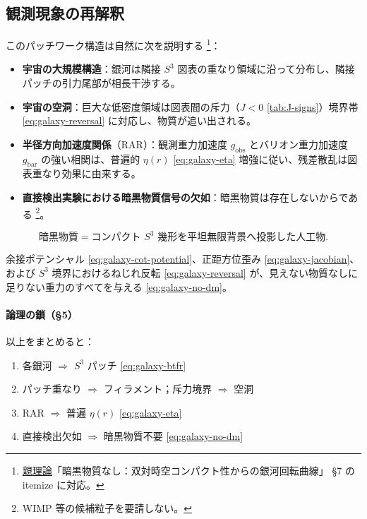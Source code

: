 \documentclass[dvipdfmx,a4paper,oneside]{jsbook}
\numberwithin{equation}{chapter}
\begin{document}
\subsection{観測現象の再解釈}

このパッチワーク構造は自然に次を説明する \footnote{\hyperref[sec:sister-manuscripts]{親理論}「暗黒物質なし：双対時空コンパクト性からの銀河回転曲線」 §7 の itemize に対応。}：
\begin{itemize}[leftmargin=2em]
  \item \textbf{宇宙の大規模構造}：銀河は隣接 \(S^3\) 図表の重なり領域に沿って分布し、隣接パッチの引力尾部が相長干渉する。
  \item \textbf{宇宙の空洞}：巨大な低密度領域は図表間の斥力（\(J < 0\) \eqref{tab:J-signs}）境界帯 \eqref{eq:galaxy-reversal} に対応し、物質が追い出される。
  \item \textbf{半径方向加速度関係}（RAR）：観測重力加速度 \(g_{\mathrm{obs}}\) とバリオン重力加速度 \(g_{\mathrm{bar}}\) の強い相関は、普遍的 \(\eta(r)\) \eqref{eq:galaxy-eta} 増強に従い、残差散乱は図表重なり効果に由来する。
  \item \textbf{直接検出実験における暗黒物質信号の欠如}：暗黒物質は存在しないからである \footnote{WIMP 等の候補粒子を要請しない。}。
\end{itemize}

\begin{equation}
  \boxed{\;
  \text{暗黒物質} = \text{コンパクト } S^3 \text{ 幾形を平坦無限背景へ投影した人工物}.
  \;}
  \label{eq:galaxy-no-dm}
\end{equation}

余接ポテンシャル \eqref{eq:galaxy-cot-potential}、正距方位歪み \eqref{eq:galaxy-jacobian}、および \(S^3\) 境界におけるねじれ反転 \eqref{eq:galaxy-reversal} が、見えない物質なしに足りない重力のすべてを与える \eqref{eq:galaxy-no-dm}。

\paragraph{論理の鎖（§5）}
以上をまとめると：
\begin{enumerate}[leftmargin=2em]
  \item 各銀河 \(\Rightarrow\) \(S^3\) パッチ \eqref{eq:galaxy-btfr}
  \item パッチ重なり \(\Rightarrow\) フィラメント；斥力境界 \(\Rightarrow\) 空洞
  \item RAR \(\Rightarrow\) 普遍 \(\eta(r)\) \eqref{eq:galaxy-eta}
  \item 直接検出欠如 \(\Rightarrow\) 暗黒物質不要 \eqref{eq:galaxy-no-dm}
\end{enumerate}
\end{document}
